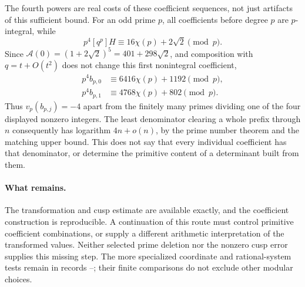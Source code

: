 The fourth powers are real costs of these coefficient sequences, not
just artifacts of this sufficient bound. For an odd prime $p$, all
coefficients before degree $p$ are $p$-integral, while
\[
 p^4[q^p]H\equiv16\chi(p)+2\sqrt2\pmod p.
\]
Since $\mathcal A(0)=(1+2\sqrt2)^5=401+298\sqrt2$, and composition
with $q=t+O(t^2)$ does not change this first nonintegral coefficient,
\begin{equation}\label{eq:modular-prime-coeff}
 \begin{split}
 p^4b_{p,0}&\equiv6416\chi(p)+1192\pmod p,\\
 p^4b_{p,1}&\equiv4768\chi(p)+802\pmod p.
 \end{split}
\end{equation}
Thus $v_p(b_{p,j})=-4$ apart from the finitely many primes dividing
one of the four displayed nonzero integers. The least denominator
clearing a whole prefix through $n$ consequently has logarithm
$4n+o(n)$, by the prime number theorem and the matching upper bound.
This does not say that every individual coefficient has that denominator,
or determine the primitive content of a determinant built from them.

\paragraph{What remains.}
The transformation and cusp estimate are available exactly, and the
coefficient construction is reproducible. A continuation of this route
must control primitive coefficient combinations, or supply a different
arithmetic interpretation of the transformed values. Neither selected
prime deletion nor the nonzero cusp error supplies this missing step.
The more specialized coordinate and rational-system tests remain in
records --; their finite comparisons do not
exclude other modular choices.
